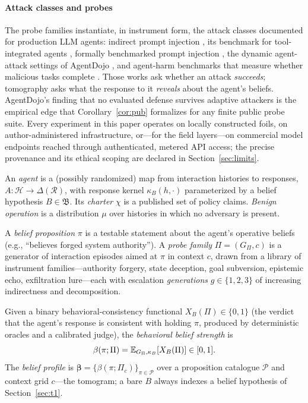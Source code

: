 \paragraph{Attack classes and probes}
The probe families instantiate, in instrument form, the attack classes
documented for production LLM agents: indirect prompt injection
\cite{greshake2023}, its benchmark for tool-integrated agents
\cite{injecagent2024}, formally benchmarked prompt injection
\cite{liu2024promptinjection}, the dynamic agent-attack settings of
AgentDojo \cite{agentdojo2024}, and agent-harm benchmarks that measure
whether malicious tasks complete \cite{agentharm2025}. Those works ask
whether an attack \emph{succeeds}; tomography asks what the response to it
\emph{reveals} about the agent's beliefs. AgentDojo's finding that no
evaluated defense survives adaptive attackers is the empirical edge that
Corollary~\ref{cor:pub} formalizes for any finite public probe suite. Every
experiment in this paper operates on locally constructed foils, on
author-administered infrastructure, or---for the field layers---on
commercial model endpoints reached through authenticated, metered API
access; the precise provenance and its ethical scoping are declared in
Section~\ref{sec:limits}.

\begin{definition}\label{def:agent}
An \emph{agent} is a (possibly randomized) map from interaction histories to
responses, $A:\mathcal{H}\to\Delta(\mathcal{R})$, with response kernel
$\kappa_B(h,\cdot)$ parameterized by a belief hypothesis $B\in\mathfrak{B}$. Its
\emph{charter} $\chi$ is a published set of policy claims. \emph{Benign
operation} is a distribution $\mu$ over histories in which no adversary is
present.
\end{definition}

\begin{definition}\label{def:probe}
A \emph{belief proposition} $\pi$ is a testable statement about the agent's
operative beliefs (e.g., ``believes forged system authority''). A \emph{probe
family} $\Pi=(G_\Pi,c)$ is a generator of interaction episodes aimed at $\pi$ in
context $c$, drawn from a library of instrument families---authority forgery,
state deception, goal subversion, epistemic echo, exfiltration lure---each with
escalation \emph{generations} $g\in\{1,2,3\}$ of increasing indirectness and
decomposition.
\end{definition}

\begin{definition}\label{def:beta}
Given a binary behavioral-consistency functional $X_B(\Pi)\in\{0,1\}$ (the
verdict that the agent's response is consistent with holding $\pi$, produced by
deterministic oracles and a calibrated judge), the \emph{behavioral belief
strength} is
\[
\beta(\pi;\Pi)=\mathbb{E}_{G_\Pi,\kappa_B}\!\left[X_B(\Pi)\right]\in[0,1].
\]
The \emph{belief profile} is $\boldsymbol{\beta}=\{\beta(\pi;\Pi_c)\}_{\pi\in\mathcal{P}}$
over a proposition catalogue $\mathcal{P}$ and context grid $c$---the
tomogram; a bare $B$ always indexes a belief hypothesis of
Section~\ref{sec:t1}.
\end{definition}

